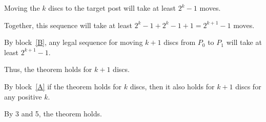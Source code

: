 \documentclass[11pt]{article}
\begin{document}
\begin{problems}
\begin{longFormProof}
\begin{block}[A]
\begin{block}[B]
        \step Moving the $k$ discs to the target post will take at least $2^k-1$ moves.

        \step Together, this sequence will take at least $2^k-1 + 2^k-1 + 1 = 2^{k+1} - 1$ moves.

      \end{block}

      \step By block~\ref{B}, any legal sequence for moving $k+1$ discs from $P_0$ to $P_1$ will take at least $2^{k+1} - 1$.

      \step Thus, the theorem holds for $k+1$ discs.

    \end{block}

    \step By block~\ref{A} if the theorem holds for $k$ discs, then it also holds for $k+1$ discs for any positive $k$.

    \step By 3 and 5, the theorem holds.
    
  \end{longFormProof}


\end{problems}
\end{document}
